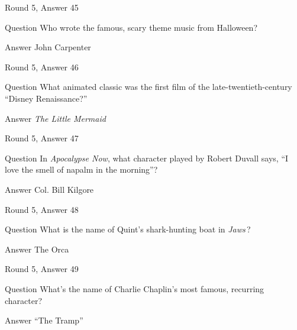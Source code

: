 \documentclass[11pt]{beamer}
\begin{document}
\begin{frame}[t]{Round 5, Answer 45}
\vspace{2em}
\begin{block}{Question}
Who wrote the famous, scary theme music from Halloween?
\end{block}
\pause{}
\begin{block}{Answer}
John Carpenter
\end{block}
\end{frame}
    

\begin{frame}[t]{Round 5, Answer 46}
\vspace{2em}
\begin{block}{Question}
What animated classic was the first film of the late-twentieth-century ``Disney Renaissance?''
\end{block}
\pause{}
\begin{block}{Answer}
\emph{The Little Mermaid}
\end{block}
\end{frame}
    

\begin{frame}[t]{Round 5, Answer 47}
\vspace{2em}
\begin{block}{Question}
In \emph{Apocalypse Now}, what character played by Robert Duvall says, ``I love the smell of napalm in the morning''?
\end{block}
\pause{}
\begin{block}{Answer}
Col. Bill Kilgore
\end{block}
\end{frame}
    

\begin{frame}[t]{Round 5, Answer 48}
\vspace{2em}
\begin{block}{Question}
What is the name of Quint's shark-hunting boat in \emph{Jaws}\,?
\end{block}
\pause{}
\begin{block}{Answer}
The Orca
\end{block}
\end{frame}
    

\begin{frame}[t]{Round 5, Answer 49}
\vspace{2em}
\begin{block}{Question}
What's the name of Charlie Chaplin's most famous, recurring character?
\end{block}
\pause{}
\begin{block}{Answer}
``The Tramp''
\end{block}
\end{frame}
    
\end{document}
